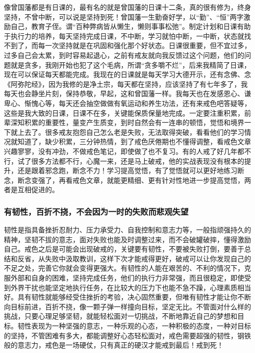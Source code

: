 像曾国藩都是有日课的，最有名的就是曾国藩的日课十二条，真的很有修为，终身坚持，不曾中断，可以说是坚持到死！曾国藩一生勤奋好学，以“勤”、“恒”两字激励自己，教育子侄。谓“百种弊病皆从懒生，懒则事事松弛”。制定计划和日课有助于执行力的培养，每天坚持完成日课，不中断，学习就怕中断，一中断，状态就找不到了，而每一次坚持就是在巩固和强化那个好状态。日课很重要，但不宜过多，过多自己会太累，到时容易起退心，之前有戒友就向我反馈过这个问题，他们的问题就是贪多，我刚开始也犯了这个毛病，所谓“贪多嚼不烂”，后来我精简了日课，现在可以保证每天都能完成。我现在的日课就是每天学习大德开示，还有念佛、念《阿弥陀经》，因为我修的是净土宗，每天都在坚持，应该坚持了有七年多了，我每天也会静坐片刻，保持恭敬，早起，这和曾国藩一样。我每天也在发感恩心、谦卑心、惭愧心等，每天还会抽空做做有氧运动和养生功法，还有来戒色吧答疑等，这些是我大致的日课，日课不在多，关键能保质保量地完成。一定要注重积累，前辈深知积累的重要性，量变产生质变，到时自然会有一连串的顿悟，觉悟和境界一下就上去了。很多戒友抱怨自己怎么老是失败，无法取得突破，看看他们的学习情况就知道了，缺少积累，三分钟热情，到了戒色厌倦期也不懂得调整，看戒色文章兴趣寥寥，没有冲劲，不做戒色笔记，即使做了也不复习。有的人戒了好几年都不行，试了很多方法都不行，心魔一来，还是马上破戒，他的实战表现没有根本的提升，还是跟着邪念跑，断念不力！学习提高觉悟，有了觉悟就可以更好地练习断念，断念变强了，再看戒色文章，就能更精细、更有针对性地进一步提高觉悟，两者是互相促进的。

\subsubsection{有韧性，百折不挠，不会因为一时的失败而悲观失望}

韧性是指具备挫折忍耐力、压力承受力、自我控制和意志力等，一般指顽强持久的精神，坚韧不拔的意志，面对失败也能及时调整过来，而不会破罐破摔，懂得激励自己。戒色之后是可能会出现破戒的，关键要有韧性，不要被失败打倒，要善于总结和反省，从失败中汲取教训，这样下次才能戒得更好，破戒可以让你发现自己的不足之处，完善它你就会变得更强大。有韧性的人能在艰苦的、不利的情况下，克服外部和自身的困难，坚持完成任务，他们的执行力非常强，而且很稳定，即使受到外界干扰也能坚定地执行任务，在比较大的压力下也能不急不躁，心理素质相当好。具有韧性就能够经受住挫折的考验，决心固然重要，但唯有韧性才能让你不断向目标前进，百折不挠，像一颗子弹一样撞向目标，坚定无比。不管面对什么样的挑战，只要心理足够坚韧，就能轻松面对一切挑战，不断地靠近自己的梦想和目标。韧性表现为一种坚强的意志，一种乐观的心态，一种积极的态度，一种对目标的坚持，不管困难有多大，都能调整好心态轻松面对，戒色需要超强的韧性，钢铁般的意志力，戒色是一场硬仗，只有真正的硬汉才能戒到最后！戒到死！

